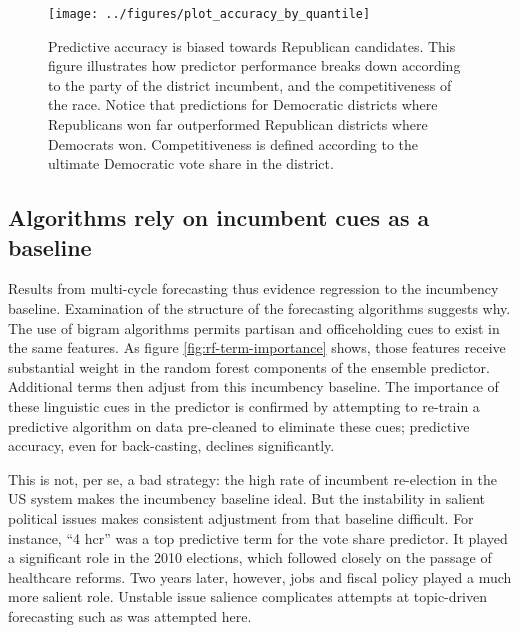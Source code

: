 \documentclass{acm_proc_article-sp}
\begin{document}



\begin{figure}[ht]
  \centering
  \texttt{[image: ../figures/plot\_accuracy\_by\_quantile]}
  \caption{Predictive accuracy is biased towards Republican
    candidates. This figure illustrates how predictor performance
    breaks down according to the party of the district incumbent, and
    the competitiveness of the race. Notice that predictions for
    Democratic districts where Republicans won far outperformed
    Republican districts where Democrats won. Competitiveness is defined according to the ultimate Democratic vote share in the district. }
  \label{fig:accuracy-by-competitiveness}
\end{figure}



\subsection{Algorithms rely on incumbent cues as a baseline}
\label{sec:algor-behav-perf}

Results from multi-cycle forecasting thus evidence regression to
the incumbency baseline. Examination of the structure of the
forecasting algorithms suggests why. The use of
bigram algorithms permits partisan and officeholding cues to exist in
the same features. As figure \ref{fig:rf-term-importance} shows, those
features receive substantial weight in the random forest components of
the ensemble predictor. Additional terms then adjust from this incumbency baseline. The
importance of these linguistic cues in the predictor is confirmed by
attempting to re-train a predictive algorithm on data pre-cleaned to
eliminate these cues; predictive accuracy, even for back-casting,
declines significantly.

This is not, per se, a bad strategy: the high rate of incumbent
re-election in the US system makes the incumbency baseline ideal. But
the instability in salient political issues makes consistent
adjustment from that baseline difficult. For instance, ``4 hcr'' was a
top predictive term for the vote share predictor. It played a
significant role in the 2010 elections, which followed closely on the
passage of healthcare reforms. Two years later, however, jobs and
fiscal policy played a much more salient role. Unstable issue salience
complicates attempts at topic-driven forecasting such as was attempted
here. 
\end{document}
